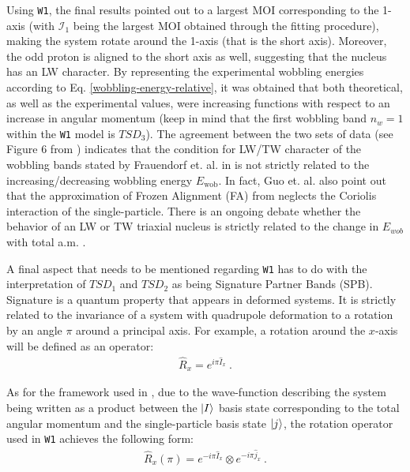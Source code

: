 \documentclass[11pt]{article}
\begin{document}
Using \texttt{W1}, the final results pointed out to a largest MOI corresponding to the 1-axis (with $\mathcal{I}_1$ being the largest MOI obtained through the fitting procedure), making the system rotate around the 1-axis (that is the short axis). Moreover, the odd proton is aligned to the short axis as well, suggesting that the nucleus has an LW character. By representing the experimental wobbling energies according to Eq. \ref{wobbling-energy-relative}, it was obtained that both theoretical, as well as the experimental values, were increasing functions with respect to an increase in angular momentum (keep in mind that the first wobbling band $n_w=1$ within the \texttt{W1} model is $TSD_3$). The agreement between the two sets of data (see Figure 6 from \cite{raduta2020approach}) indicates that the condition for LW/TW character of the wobbling bands stated by Frauendorf et. al. in \cite{frauendorf2014transverse} is not strictly related to the increasing/decreasing wobbling energy $E_\text{wob}$. In fact, Guo et. al. \cite{guo2020risk} also point out that the approximation of Frozen Alignment (FA) from \cite{frauendorf2014transverse} neglects the Coriolis interaction of the single-particle. There is an ongoing debate whether the behavior of an LW or TW triaxial nucleus is strictly related to the change in $E_{wob}$ with total a.m. \cite{tanabe2017stability,frauendorf2018comment,tanabe2018reply}.


A final aspect that needs to be mentioned regarding \texttt{W1} has to do with the interpretation of $TSD_1$ and $TSD_2$ as being Signature Partner Bands (SPB). Signature \cite{bohr1998nuclear} is a quantum property that appears in deformed systems. It is strictly related to the invariance of a system with quadrupole deformation to a rotation by an angle $\pi$ around a principal axis. For example, a rotation around the $x$-axis will be defined as an operator:
\begin{align}
    \hat{R}_x=e^{i\pi\hat{I}_x}\ .
\end{align}

As for the framework used in \cite{raduta2020approach,raduta2020towards}, due to the wave-function describing the system being written as a product between the $\ket{I}$ basis state corresponding to the total angular momentum and the single-particle basis state $\ket{j}$, the rotation operator used in \texttt{W1} achieves the following form:
\begin{align}
    \hat{R}_x(\pi)=e^{-i\pi\hat{I}_x}\otimes e^{-i\pi\hat{j}_x}\ .
\end{align}
\end{document}

